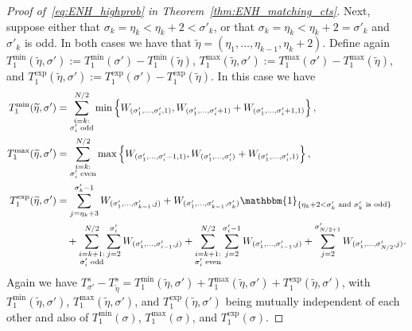 \documentclass[11pt]{article}
\numberwithin{equation}{section}
\newcommand{\wt}{\widetilde} %
\theoremstyle{definition}
\begin{document}
\begin{proof}[Proof of~\eqref{eq:ENH_highprob} in Theorem~\ref{thm:ENH_matching_cts}]
Next, suppose 
either that 
$\sigma_{k} = \eta_{k} < \eta_{k} + 2 < \sigma'_{k}$, 
or that 
$\sigma_{k} = \eta_{k} < \eta_{k} + 2 = \sigma'_{k}$ 
and $\sigma'_{k}$ is odd. 
In both cases we have that  
$\wt{\eta} = (\eta_{1}, \ldots, \eta_{k-1}, \eta_{k} + 2)$. 
Define again 
$T_{1}^{\min} \left( \wt{\eta}, \sigma' \right) := T_{1}^{\min} \left( \sigma' \right) - T_{1}^{\min} \left( \wt{\eta} \right)$, 
$T_{1}^{\max} \left( \wt{\eta}, \sigma' \right) := T_{1}^{\max} \left( \sigma' \right) - T_{1}^{\max} \left( \wt{\eta} \right)$, 
and 
$T_{1}^{\exp} \left( \wt{\eta}, \sigma' \right) := T_{1}^{\exp} \left( \sigma' \right) - T_{1}^{\exp} \left( \wt{\eta} \right)$. 
In this case we have 
\begin{align*}
    T_{1}^{\min}(\wt{\eta}, \sigma') 
    &= 
    \sum_{\substack{i=k: \\ \sigma'_{i} \text{ odd}}}^{N/2} \min \left\{ W_{(\sigma'_1,\ldots,\sigma'_i,1)} , W_{(\sigma'_1,\ldots,\sigma'_i + 1 )} + W_{(\sigma'_1,\ldots,\sigma'_i + 1, 1)} \right\}, \\
    T_{1}^{\max}(\wt{\eta}, \sigma')
    &=
    \sum_{\substack{i=k: \\ \sigma'_{i} \text{ even}}}^{N/2} \max \left\{ W_{(\sigma'_1,\ldots,\sigma'_{i}-1,1)} , W_{(\sigma'_1,\ldots,\sigma'_i  )} + W_{(\sigma'_1,\ldots,\sigma'_i, 1)} \right\}, \\
    T_{1}^{\exp}(\wt{\eta}, \sigma')
    &=
    \sum_{j = \eta_{k}+3}^{\sigma'_{k}-1} W_{(\sigma'_{1}, \ldots, \sigma'_{k-1},j)} 
    + W_{(\sigma'_{1}, \ldots, \sigma'_{k-1},\sigma'_{k})} \mathbbm{1}_{\{ \eta_{k} + 2 < \sigma'_{k} \text{ and } \sigma'_{k} \text{ is odd} \}} \\
    &\quad + \sum_{\substack{i=k+1: \\ \sigma'_{i} \text{ odd}}}^{N/2} \sum_{j=2}^{\sigma'_i} W_{(\sigma'_1,\ldots,\sigma'_{i-1},j)}
    +
    \sum_{\substack{i=k+1: \\ \sigma'_{i} \text{ even}}}^{N/2} \sum_{j=2}^{\sigma'_i-1} W_{(\sigma'_1,\ldots,\sigma'_{i-1},j)} 
    +
    \sum_{j=2}^{\sigma'_{N/2+1}} W_{(\sigma'_1,\ldots,\sigma'_{N/2},j)}.
\end{align*}
Again we have 
$T_{\sigma'}^{s} - T_{\wt{\eta}}^{s} 
= T_{1}^{\min} \left( \wt{\eta}, \sigma' \right) + T_{1}^{\max} \left( \wt{\eta}, \sigma' \right) + T_{1}^{\exp} \left( \wt{\eta}, \sigma' \right)$, 
with 
$T_{1}^{\min} \left( \wt{\eta}, \sigma' \right)$, 
$T_{1}^{\max} \left( \wt{\eta}, \sigma' \right)$, 
and 
$T_{1}^{\exp} \left( \wt{\eta}, \sigma' \right)$ 
being mutually independent of each other 
and also of 
$T_{1}^{\min} \left( \sigma \right)$, 
$T_{1}^{\max} \left( \sigma \right)$, 
and 
$T_{1}^{\exp} \left( \sigma \right)$. 


\end{proof}
\end{document}
